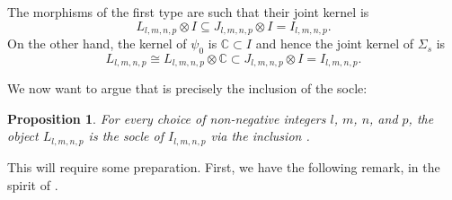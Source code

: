 \documentclass[11pt]{article}
\theoremstyle{plain}
\newtheorem{proposition}[lemma]{Proposition}
\theoremstyle{nonumberplain}
\theoremstyle{plain}
\numberwithin{equation}{section}
\theoremstyle{nonumberplain}
\newcommand\bC{{\mathbb C}}
\newcommand\1{{\bf 1}}
\begin{document}
The morphisms of the first type are such that their joint kernel is
\begin{equation*}
  L_{l,m,n,p}\otimes I\subseteq  J_{l,m,n,p}\otimes I=I_{l,m,n,p}. 
\end{equation*}
On the other hand, the kernel of $\psi_0$ is $\bC\subset I$ and hence the joint kernel of $\Sigma_s$ is
\begin{equation}\label{eq:4}
  L_{l,m,n,p}\cong L_{l,m,n,p}\otimes \bC\subset J_{l,m,n,p}\otimes I=I_{l,m,n,p}. 
\end{equation}

We now want to argue that  is precisely the inclusion of the socle:

\begin{proposition}\label{pr.soc}
  For every choice of non-negative integers $l$, $m$, $n$, and $p$, the object $L_{l,m,n,p}$ is the socle of $I_{l,m,n,p}$ via the inclusion . 
\end{proposition}

This will require some preparation. First, we have the following remark, in the spirit of \cite[Lemma 3.1]{us0}. 
\end{document}
